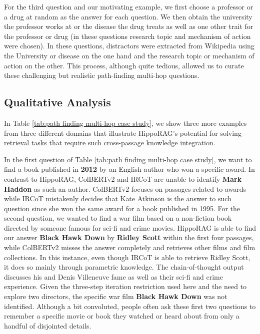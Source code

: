 \documentclass{article}
\begin{document}
\begin{appendices}
For the third question and our motivating example, we first choose a professor or a drug at random as the answer for each question. We then obtain the university the professor works at or the disease the drug treats as well as one other trait for the professor or drug (in these questions research topic and mechanism of action were chosen). In these questions, distractors were extracted from Wikipedia using the University or disease on the one hand and the research topic or mechanism of action on the other. This process, although quite tedious, allowed us to curate these challenging but realistic path-finding multi-hop questions.

\subsection{Qualitative Analysis}

In Table \ref{tab:path finding multi-hop case study}, we show three more examples from three different domains that illustrate HippoRAG's potential for solving retrieval tasks that require such cross-passage knowledge integration.

In the first question of Table \ref{tab:path finding multi-hop case study}, we want to find a book published in \textbf{2012} by an English author who won a specific award. In contrast to HippoRAG, ColBERTv2 and IRCoT are unable to identify \textbf{Mark Haddon} as such an author. ColBERTv2 focuses on passages related to awards while IRCoT mistakenly decides that Kate Atkinson is the answer to such question since she won the same award for a book published in 1995. 
For the second question, we wanted to find a war film based on a non-fiction book directed by someone famous for sci-fi and crime movies. 
HippoRAG is able to find our answer \textbf{Black Hawk Down} by \textbf{Ridley Scott} within the first four passages, while ColBERTv2 misses the answer completely and retrieves other films and film collections.
In this instance, even though IRCoT is able to retrieve Ridley Scott, it does so mainly through parametric knowledge. The chain-of-thought output discusses his and Denis Villeneuve fame as well as their sci-fi and crime experience. Given the three-step iteration restriction used here and the need to explore two directors, the specific war film \textbf{Black Hawk Down} was not identified.
Although a bit convoluted, people often ask these first two questions to remember a specific movie or book they watched or heard about from only a handful of disjointed details.


\end{appendices}
\end{document}
